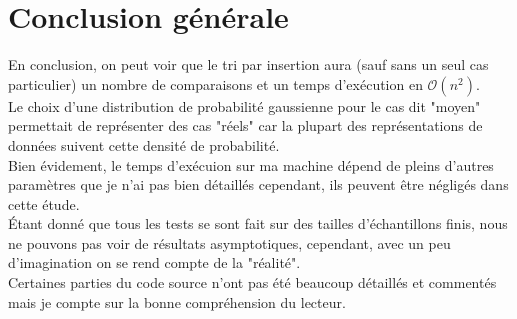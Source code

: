 \documentclass[a4paper,12pt]{article}
\begin{document}
\section{Conclusion générale}
En conclusion, on peut voir que le tri par insertion aura (sauf sans un seul cas particulier) un nombre de comparaisons et un temps d'exécution en $\mathcal{O}(n^2)$. \\
Le choix d'une distribution de probabilité gaussienne pour le cas dit "moyen" permettait de représenter des cas "réels" car la plupart des représentations de données suivent cette densité de probabilité. \\
Bien évidement, le temps d'exécuion sur ma machine dépend de pleins d'autres paramètres que je n'ai pas bien détaillés cependant, ils peuvent être négligés dans cette étude. \\
Étant donné que tous les tests se sont fait sur des tailles d'échantillons finis, nous ne pouvons pas voir de résultats asymptotiques, cependant, avec un peu d'imagination on se rend compte de la "réalité". \\
Certaines parties du code source n'ont pas été beaucoup détaillés et commentés mais je compte sur la bonne compréhension du lecteur. 
\end{document}
